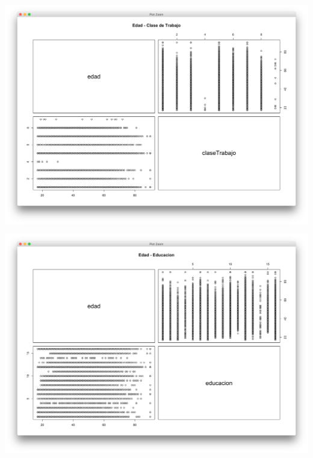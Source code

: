\documentclass{article}
\begin{document}
  \begin{center}
    \hbox{\hspace{-5.5em}\includegraphics[scale=0.45]{graficas/edadClaseTrab}}
  \end{center}
  \begin{center}
    \hbox{\hspace{-5.5em}\includegraphics[scale=0.45]{graficas/edadEdu}}
  \end{center}
\end{document}
